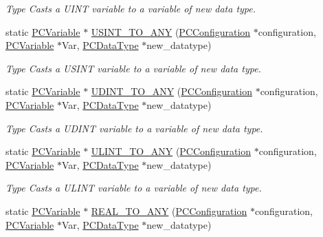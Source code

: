 \begin{DoxyCompactItemize}
\begin{DoxyCompactList}\small\item\em Type Casts a U\+I\+NT variable to a variable of new data type. \end{DoxyCompactList}\item 
static \hyperlink{classpc__emulator_1_1PCVariable}{P\+C\+Variable} $\ast$ \hyperlink{classpc__emulator_1_1Utils_acc006b6ca5db8593d1114737bb97332f}{U\+S\+I\+N\+T\+\_\+\+T\+O\+\_\+\+A\+NY} (\hyperlink{classpc__emulator_1_1PCConfiguration}{P\+C\+Configuration} $\ast$configuration, \hyperlink{classpc__emulator_1_1PCVariable}{P\+C\+Variable} $\ast$Var, \hyperlink{classpc__emulator_1_1PCDataType}{P\+C\+Data\+Type} $\ast$new\+\_\+datatype)
\begin{DoxyCompactList}\small\item\em Type Casts a U\+S\+I\+NT variable to a variable of new data type. \end{DoxyCompactList}\item 
static \hyperlink{classpc__emulator_1_1PCVariable}{P\+C\+Variable} $\ast$ \hyperlink{classpc__emulator_1_1Utils_ade3492aa5889fb553725e078cce4f040}{U\+D\+I\+N\+T\+\_\+\+T\+O\+\_\+\+A\+NY} (\hyperlink{classpc__emulator_1_1PCConfiguration}{P\+C\+Configuration} $\ast$configuration, \hyperlink{classpc__emulator_1_1PCVariable}{P\+C\+Variable} $\ast$Var, \hyperlink{classpc__emulator_1_1PCDataType}{P\+C\+Data\+Type} $\ast$new\+\_\+datatype)
\begin{DoxyCompactList}\small\item\em Type Casts a U\+D\+I\+NT variable to a variable of new data type. \end{DoxyCompactList}\item 
static \hyperlink{classpc__emulator_1_1PCVariable}{P\+C\+Variable} $\ast$ \hyperlink{classpc__emulator_1_1Utils_ac14734b33f078b8f9796cbd59f79ca4b}{U\+L\+I\+N\+T\+\_\+\+T\+O\+\_\+\+A\+NY} (\hyperlink{classpc__emulator_1_1PCConfiguration}{P\+C\+Configuration} $\ast$configuration, \hyperlink{classpc__emulator_1_1PCVariable}{P\+C\+Variable} $\ast$Var, \hyperlink{classpc__emulator_1_1PCDataType}{P\+C\+Data\+Type} $\ast$new\+\_\+datatype)
\begin{DoxyCompactList}\small\item\em Type Casts a U\+L\+I\+NT variable to a variable of new data type. \end{DoxyCompactList}\item 
static \hyperlink{classpc__emulator_1_1PCVariable}{P\+C\+Variable} $\ast$ \hyperlink{classpc__emulator_1_1Utils_a0b12cd05a3e2271610a851da6b2d92a2}{R\+E\+A\+L\+\_\+\+T\+O\+\_\+\+A\+NY} (\hyperlink{classpc__emulator_1_1PCConfiguration}{P\+C\+Configuration} $\ast$configuration, \hyperlink{classpc__emulator_1_1PCVariable}{P\+C\+Variable} $\ast$Var, \hyperlink{classpc__emulator_1_1PCDataType}{P\+C\+Data\+Type} $\ast$new\+\_\+datatype)

\end{DoxyCompactItemize}
